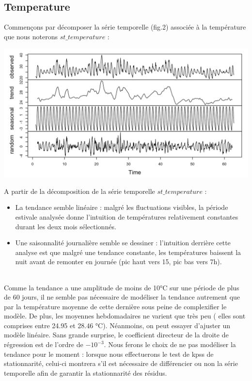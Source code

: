 \documentclass{article}
\theoremstyle{definition}
\theoremstyle{remark}
\begin{document}
\subsection{Temperature}
Commençons par décomposer la série temporelle (fig.2) associée à la température que nous noterons $st\_temperature$ :
\FloatBarrier
\begin{minipage}{.5\textwidth}
\hspace{-1cm}
\includegraphics[width=0.95\linewidth]{fig2.png}
    \label{fig:enter-label}
\end{minipage}
\begin{minipage}{.5\textwidth}
    A partir de la décomposition de la série temporelle $st\_temperature$ :
    \begin{itemize}
    \item La tendance semble linéaire : malgré les fluctuations visibles, la période estivale analysée donne l'intuition de températures relativement constantes durant les deux mois sélectionnés.  
    \item Une saisonnalité journalière semble se dessiner : l'intuition derrière cette analyse est que malgré une tendance constante, les températures baissent la nuit avant de remonter en journée (pic haut vers 15, pic bas vers 7h).
    \end{itemize}
\end{minipage}
\newline
\\
Comme la tendance a une amplitude de moins de 10°C sur une période de plus de 60 jours, il ne semble pas nécessaire de modéliser la tendance autrement que par la température moyenne de cette dernière sous peine de complexifier le modèle. De plus, les moyennes hebdomadaires ne varient que très peu ( elles sont comprises entre 24.95 et 28.46 °C). Néanmoins, on peut essayer d'ajuster un modèle linéaire. Sans grande surprise, le coefficient directeur de la droite de régression est de l'ordre de $-10^{-3}$. Nous ferons le choix de ne pas modéliser la tendance pour le moment : lorsque nous effectuerons le test de kpss de stationnarité, celui-ci montrera s'il est nécessaire de différencier ou non la série temporelle afin de garantir la stationnarité des résidus.
\end{document}
